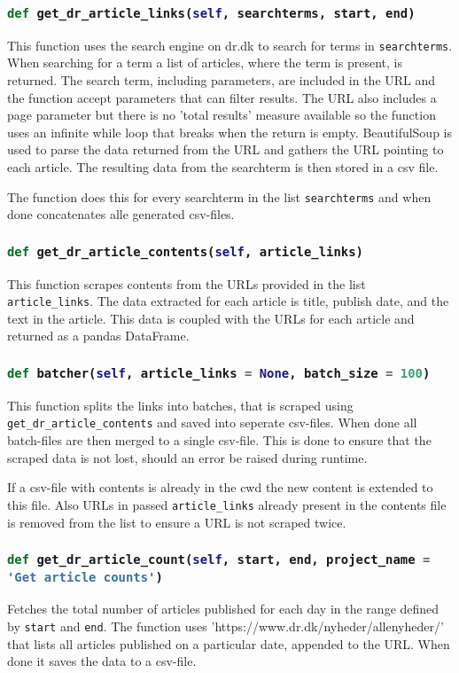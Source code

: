 \documentclass[10pt,a4paper]{article}
\newcommand{\python}{\lstinline[language=Python]}
\begin{document}
		\subsubsection{\python|def get_dr_article_links(self, searchterms, start, end)|}
			This function uses the search engine on dr.dk to search for terms in \python{searchterms}. When searching for a term a list of articles, where the term is present, is returned. The search term, including parameters, are included in the URL and the function accept parameters that can filter results. The URL also includes a page parameter but there is no 'total results' measure available so the function uses an infinite while loop that breaks when the return is empty. BeautifulSoup is used to parse the data returned from the URL and gathers the URL pointing to each article. The resulting data from the searchterm is then stored in a csv file.
			
			The function does this for every searchterm in the list \python {searchterms} and when done concatenates alle generated csv-files.
			
		\subsubsection{\python{def get_dr_article_contents(self, article_links)}}
			This function scrapes contents from the URLs provided in the list \python{article_links}. The data extracted for each article is title, publish date, and the text in the article. This data is coupled with the URLs for each article and returned as a pandas DataFrame.
			
		\subsubsection{\python{def batcher(self, article_links = None, batch_size = 100)}}
			This function splits the links into batches, that is scraped using \python{get_dr_article_contents} and saved into seperate csv-files. When done all batch-files are then merged to a single csv-file. This is done to ensure that the scraped data is not lost, should an error be raised during runtime.
			
			If a csv-file with contents is already in the cwd the new content is extended to this file. Also URLs in passed \python{article_links} already present in the contents file is removed from the list to ensure a URL is not scraped twice.
			
		\subsubsection{\python{def get_dr_article_count(self, start, end, project_name = 'Get article counts')}}
			Fetches the total number of articles published for each day in the range defined by \python{start} and \python{end}. The function uses 'https://www.dr.dk/nyheder/allenyheder/' that lists all articles published on a particular date, appended to the URL. When done it saves the data to a csv-file.
\end{document}
